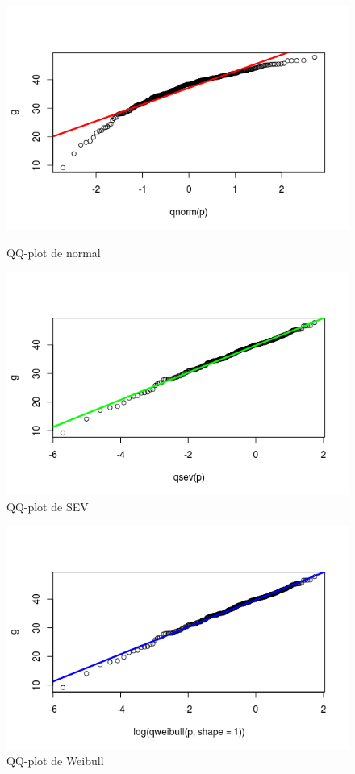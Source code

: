 \documentclass{article}
\begin{document}
\begin{figure}[h!]
\begin{minipage}{6cm}
\includegraphics[scale=0.5]{./figures/normal.png}
\caption{QQ-plot de normal}
\end{minipage}
\hspace*{2cm}
\begin{minipage}{6cm}
\includegraphics[scale=0.5]{./figures/sev.png}
\caption{QQ-plot de SEV}
\end{minipage}
\end{figure}
\begin{figure}[h!]
\centering
\includegraphics[scale=0.5]{./figures/weibull.png}
\caption{QQ-plot de Weibull}
\end{figure}
\end{document}
